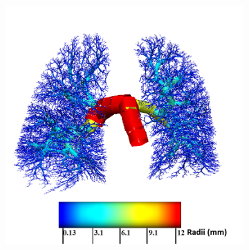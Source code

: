 \begin{figure}[htbp] 
\centering
\begin{subfigure}{.48\linewidth}%
  \includegraphics[width=\linewidth,trim={{.0\wd0} {.0\wd0} {.0\wd0} {.0\wd0}},clip]{ModelBasedAnalysis/Image/IPF405_ArteryRadius_IPF.png}

\end{subfigure}
\end{figure}
